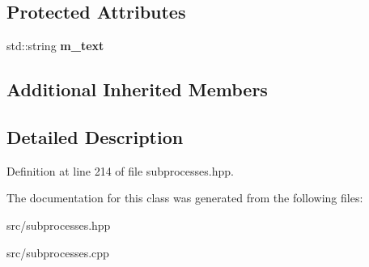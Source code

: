 \subsection*{Protected Attributes}
\begin{DoxyCompactItemize}
\item 
std\+::string {\bfseries m\+\_\+text}\hypertarget{classstlplus_1_1backtick__subprocess_ac8f053fb82da04041f8141ea729e51c4}{}\label{classstlplus_1_1backtick__subprocess_ac8f053fb82da04041f8141ea729e51c4}

\end{DoxyCompactItemize}
\subsection*{Additional Inherited Members}


\subsection{Detailed Description}


Definition at line 214 of file subprocesses.\+hpp.



The documentation for this class was generated from the following files\+:\begin{DoxyCompactItemize}
\item 
src/subprocesses.\+hpp\item 
src/subprocesses.\+cpp\end{DoxyCompactItemize}
